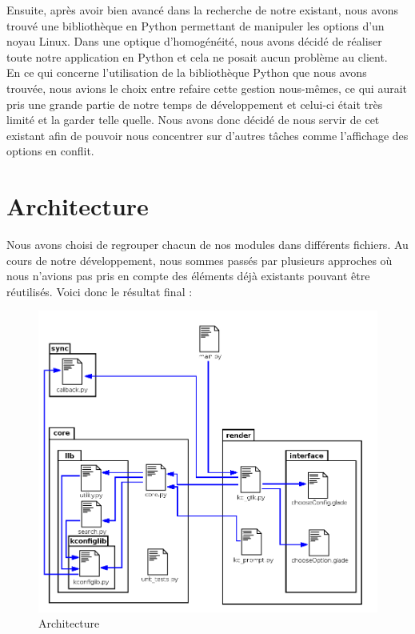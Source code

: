 \documentclass[17pts]{report}
\begin{document}
Ensuite, après avoir bien avancé dans la recherche de notre existant, nous
avons trouvé une bibliothèque en Python permettant de manipuler les options
d'un noyau Linux. Dans une optique d'homogénéité, nous avons décidé de réaliser
toute notre application en Python et cela ne posait aucun problème au client.
\\

En ce qui concerne l'utilisation de la bibliothèque Python que nous avons
trouvée, nous avions le choix entre refaire cette gestion nous-mêmes, ce qui
aurait pris une grande partie de notre temps de développement et celui-ci était
très limité et la garder telle quelle. Nous avons donc décidé de nous servir de
cet existant afin de pouvoir nous concentrer sur d'autres tâches comme
l'affichage des options en conflit.

\section{Architecture}
\label{sec:Architecture}
Nous avons choisi de regrouper chacun de nos modules dans différents fichiers.
Au cours de notre développement, nous sommes passés par plusieurs approches où
nous n'avions pas pris en compte des éléments déjà existants pouvant être
réutilisés. Voici donc le résultat final :
\begin{figure}[H]
    \includegraphics[scale=0.5]{illustrations/archi_add_v1.png}
    \centering
    \caption{Architecture}
    \label{fig:Arch}
\end{figure}
\end{document}
